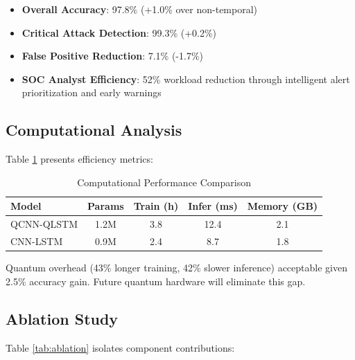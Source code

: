 \documentclass[conference]{IEEEtran}
\begin{document}
\begin{itemize}
    \item \textbf{Overall Accuracy}: 97.8\% (+1.0\% over non-temporal)
    \item \textbf{Critical Attack Detection}: 99.3\% (+0.2\%)
    \item \textbf{False Positive Reduction}: 7.1\% (-1.7\%)
    \item \textbf{SOC Analyst Efficiency}: 52\% workload reduction through intelligent alert prioritization and early warnings
\end{itemize}

\subsection{Computational Analysis}

Table \ref{tab:computational} presents efficiency metrics:

\begin{table}[htbp]
\caption{Computational Performance Comparison}
\begin{center}
\begin{tabular}{lcccc}
\toprule
\textbf{Model} & \textbf{Params} & \textbf{Train (h)} & \textbf{Infer (ms)} & \textbf{Memory (GB)} \\
\midrule
QCNN-QLSTM & 1.2M & 3.8 & 12.4 & 2.1 \\
CNN-LSTM & 0.9M & 2.4 & 8.7 & 1.8 \\
\bottomrule
\end{tabular}
\label{tab:computational}
\end{center}
\end{table}

Quantum overhead (43\% longer training, 42\% slower inference) acceptable given 2.5\% accuracy gain. Future quantum hardware will eliminate this gap.

\subsection{Ablation Study}

Table \ref{tab:ablation} isolates component contributions:
\end{document}
